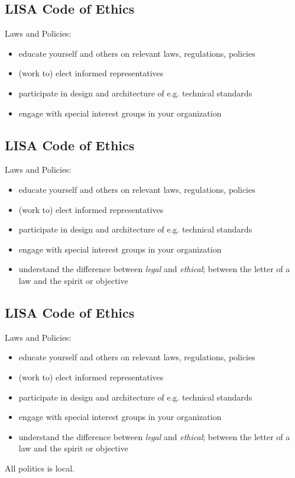 \documentclass[xga]{xdvislides}
\begin{document}
\subsection{LISA Code of Ethics}
Laws and Policies:
\begin{itemize}
	\item educate yourself and others on relevant laws, regulations, policies
	\item (work to) elect informed representatives
	\item participate in design and architecture of e.g. technical standards
	\item engage with special interest groups in your organization
\end{itemize}

\subsection{LISA Code of Ethics}
Laws and Policies:
\begin{itemize}
	\item educate yourself and others on relevant laws, regulations, policies
	\item (work to) elect informed representatives
	\item participate in design and architecture of e.g. technical standards
	\item engage with special interest groups in your organization
	\item understand the difference between {\em
legal} and {\em ethical}; between the letter of a law
and the spirit or objective
\end{itemize}

\subsection{LISA Code of Ethics}
Laws and Policies:
\begin{itemize}
	\item educate yourself and others on relevant laws, regulations, policies
	\item (work to) elect informed representatives
	\item participate in design and architecture of e.g. technical standards
	\item engage with special interest groups in your organization
	\item understand the difference between {\em
legal} and {\em ethical}; between the letter of a law
and the spirit or objective
\end{itemize}
\vspace{.5in}
All politics is local.
\end{document}
